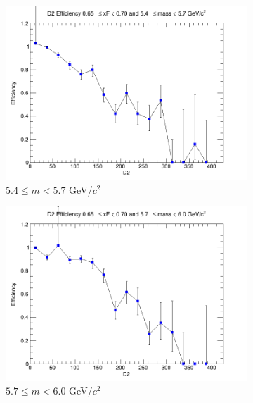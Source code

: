 \begin{figure}[p]
\begin{subfigure}[b]{0.32\textwidth}
        \includegraphics[width=\textwidth]{./kTrackerEfficiencyPlots/D2_Efficiency_xF13_mass4.png}
        \caption{$5.4 \leq m < 5.7$ GeV/$c^2$}
        \label{fig:xF13_mass4}
    \end{subfigure}
    \hfill
    \begin{subfigure}[b]{0.32\textwidth}
        \centering
        \includegraphics[width=\textwidth]{./kTrackerEfficiencyPlots/D2_Efficiency_xF13_mass5.png}
        \caption{$5.7 \leq m < 6.0$ GeV/$c^2$}
        \label{fig:xF13_mass5}
    \end{subfigure}
    \vspace{0.5cm}
    \begin{subfigure}[b]{0.32\textwidth}
        \centering

\end{subfigure}
\end{figure}
